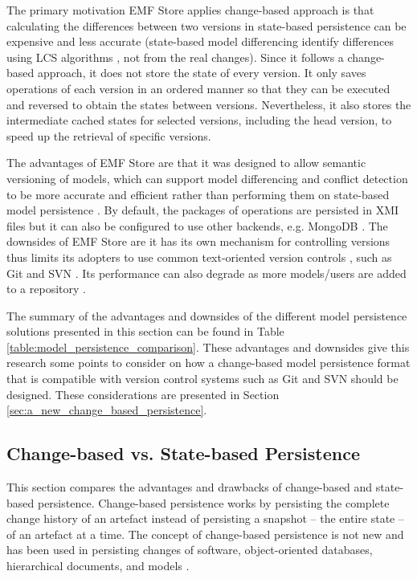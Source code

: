The primary motivation EMF Store applies change-based approach is that calculating the differences between two versions in state-based persistence can be expensive and less accurate \cite{emfstore2019versioning} (state-based model differencing identify differences using LCS algorithms \cite{emfcompare2018developer,DBLP:journals/algorithmica/Meyers86}, not from the real changes). Since it follows a change-based approach, it does not store the state of every version. It only saves operations of each version in an ordered manner so that they can be executed and reversed to obtain the states between versions. Nevertheless, it also stores the intermediate cached states for selected versions, including the head version, to speed up the retrieval of specific versions.

The advantages of EMF Store are that it was designed to allow semantic versioning of models, which can support model differencing and conflict detection to be more accurate and efficient rather than performing them on state-based model persistence \cite{emfstore2019versioning}. By default, the packages of operations are persisted in XMI files but it can also be configured to use other backends, e.g. MongoDB \cite{emfstore2019mongodb}. The downsides of EMF Store are it has its own mechanism for controlling versions thus limits its adopters to use common text-oriented version controls \cite{emfstore2019getting}, such as Git and SVN . Its performance can also degrade as more models/users are added to a repository \cite{KolovosRMPGCLRV13}.

The summary of the advantages and downsides of the different model persistence solutions presented in this section can be found in Table \ref{table:model_persistence_comparison}. These advantages and downsides give this research some points to consider on how a change-based model persistence format that is compatible with version control systems such as Git and SVN should be designed. These considerations are presented in Section \ref{sec:a_new_change_based_persistence}.

\subsection{Change-based vs. State-based Persistence}
\label{sec:change_based_vs_state_based_persistence}
This section compares the advantages and drawbacks of change-based and state-based persistence. Change-based persistence works by persisting the complete change history of an artefact instead of persisting a snapshot -- the entire state -- of an artefact at a time. The concept of change-based persistence is not new and has been used in persisting changes of software, object-oriented databases, hierarchical documents, and models 
\cite{DBLP:journals/entcs/RobbesL07,DBLP:conf/sde/LippeO92,DBLP:conf/caise/IgnatN05,koegel2010emfstore}. 

